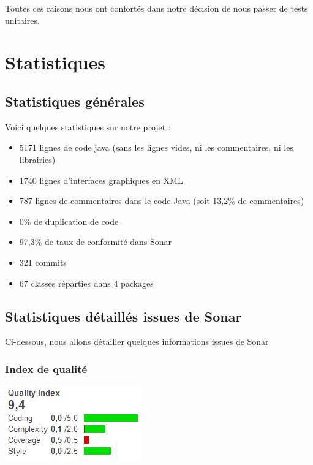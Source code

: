 \documentclass{report}
\begin{document}
Toutes ces raisons nous ont confortés dans notre décision de nous passer
de tests unitaires.

\newpage

\section{Statistiques}
\bigskip


\subsection{Statistiques générales}
\bigskip


Voici quelques statistiques sur notre projet :
\begin{itemize}
\item 5171 lignes de code java (sans les lignes vides, ni les
commentaires, ni les librairies)
\item 1740 lignes d’interfaces graphiques en XML
\item 787 lignes de commentaires dans le code Java (soit 13,2\% de
commentaires)
\item 0\% de duplication de code
\item 97,3\% de taux de conformité dans Sonar
\item 321 commits
\item 67 classes réparties dans 4 packages
\end{itemize}

\subsection{Statistiques détaillés issues de Sonar}
\bigskip


Ci-dessous, nous allons détailler quelques informations issues de Sonar

\subsubsection{Index de qualité}


\begin{center}
\includegraphics[scale=0.7]{images/quality_index}
\end{center}
\end{document}
